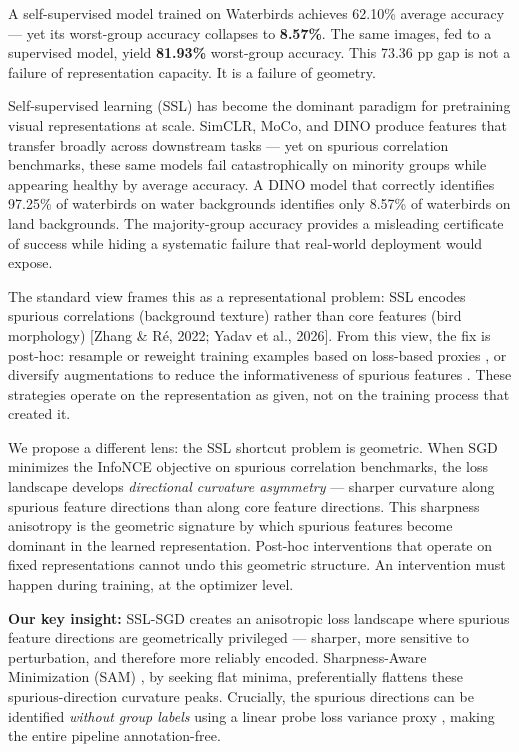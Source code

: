 
A self-supervised model trained on Waterbirds achieves 62.10\% average accuracy --- yet its worst-group accuracy collapses to \textbf{8.57\%}. The same images, fed to a supervised model, yield \textbf{81.93\%} worst-group accuracy. This 73.36 pp gap is not a failure of representation capacity. It is a failure of geometry.

Self-supervised learning (SSL) has become the dominant paradigm for pretraining visual representations at scale. SimCLR, MoCo, and DINO produce features that transfer broadly across downstream tasks --- yet on spurious correlation benchmarks, these same models fail catastrophically on minority groups while appearing healthy by average accuracy. A DINO model that correctly identifies 97.25\% of waterbirds on water backgrounds identifies only 8.57\% of waterbirds on land backgrounds. The majority-group accuracy provides a misleading certificate of success while hiding a systematic failure that real-world deployment would expose.

The standard view frames this as a representational problem: SSL encodes spurious correlations (background texture) rather than core features (bird morphology) [Zhang \& Ré, 2022; Yadav et al., 2026]. From this view, the fix is post-hoc: resample or reweight training examples based on loss-based proxies \citep{ghaznavi2023lfr}, or diversify augmentations to reduce the informativeness of spurious features \citep{yadav2026crossvariant}. These strategies operate on the representation as given, not on the training process that created it.

We propose a different lens: the SSL shortcut problem is geometric. When SGD minimizes the InfoNCE objective on spurious correlation benchmarks, the loss landscape develops \textit{directional curvature asymmetry} --- sharper curvature along spurious feature directions than along core feature directions. This sharpness anisotropy is the geometric signature by which spurious features become dominant in the learned representation. Post-hoc interventions that operate on fixed representations cannot undo this geometric structure. An intervention must happen during training, at the optimizer level.

\textbf{Our key insight:} SSL-SGD creates an anisotropic loss landscape where spurious feature directions are geometrically privileged --- sharper, more sensitive to perturbation, and therefore more reliably encoded. Sharpness-Aware Minimization (SAM) \citep{foret2021sam}, by seeking flat minima, preferentially flattens these spurious-direction curvature peaks. Crucially, the spurious directions can be identified \textit{without group labels} using a linear probe loss variance proxy \citep{ghaznavi2023lfr}, making the entire pipeline annotation-free.

